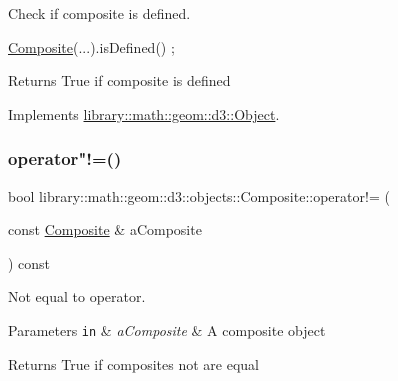 Check if composite is defined. 


\begin{DoxyCode}
\hyperlink{classlibrary_1_1math_1_1geom_1_1d3_1_1objects_1_1_composite_a65acc162c125c6ad463b26f21cb87c39}{Composite}(...).isDefined() ;
\end{DoxyCode}


\begin{DoxyReturn}{Returns}
True if composite is defined 
\end{DoxyReturn}


Implements \hyperlink{classlibrary_1_1math_1_1geom_1_1d3_1_1_object_a2216442e322f0c3ca5f01a4efa22baf7}{library\+::math\+::geom\+::d3\+::\+Object}.

\mbox{\label{classlibrary_1_1math_1_1geom_1_1d3_1_1objects_1_1_composite_a8dbf350666d7dd33a4ada8f7172dab22}} 
\subsubsection{\texorpdfstring{operator"!=()}{operator!=()}}
{\footnotesize\ttfamily bool library\+::math\+::geom\+::d3\+::objects\+::\+Composite\+::operator!= (\begin{DoxyParamCaption}\item[{const \hyperlink{classlibrary_1_1math_1_1geom_1_1d3_1_1objects_1_1_composite}{Composite} \&}]{a\+Composite }\end{DoxyParamCaption}) const}



Not equal to operator. 


\begin{DoxyParams}[1]{Parameters}
\mbox{\tt in}  & {\em a\+Composite} & A composite object \\
\hline
\end{DoxyParams}
\begin{DoxyReturn}{Returns}
True if composites not are equal 
\end{DoxyReturn}
\mbox{\label{classlibrary_1_1math_1_1geom_1_1d3_1_1objects_1_1_composite_a733b579f812eec28d898931c2597af8e}} 
